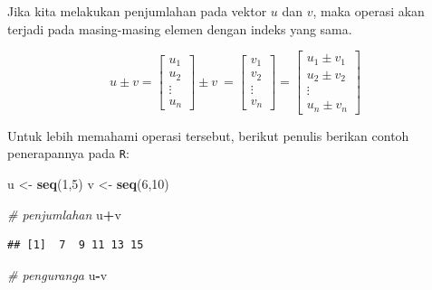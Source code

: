 \documentclass[
]{book}
\newenvironment{Shaded}{\begin{snugshade}}{\end{snugshade}}
\newcommand{\CommentTok}[1]{\textcolor[rgb]{0.56,0.35,0.01}{\textit{#1}}}
\newcommand{\DecValTok}[1]{\textcolor[rgb]{0.00,0.00,0.81}{#1}}
\newcommand{\FunctionTok}[1]{\textcolor[rgb]{0.13,0.29,0.53}{\textbf{#1}}}
\newcommand{\NormalTok}[1]{#1}
\newcommand{\OtherTok}[1]{\textcolor[rgb]{0.56,0.35,0.01}{#1}}
\newcommand{\SpecialCharTok}[1]{\textcolor[rgb]{0.81,0.36,0.00}{\textbf{#1}}}
\theoremstyle{definition}
\theoremstyle{definition}
\theoremstyle{definition}
\theoremstyle{definition}
\theoremstyle{remark}
\begin{document}
Jika kita melakukan penjumlahan pada vektor \(u\) dan \(v\), maka operasi akan terjadi pada masing-masing elemen dengan indeks yang sama.

\begin{equation}
u \pm v = \begin{bmatrix}
      u_1            \\[0.3em]
      u_2            \\[0.3em]
      \vdots         \\[0.3em] 
      u_n
     \end{bmatrix}
\pm v\ = \begin{bmatrix}
      v_1            \\[0.3em]
      v_2            \\[0.3em]
      \vdots         \\[0.3em] 
      v_n
     \end{bmatrix}
= \begin{bmatrix}
      u_1 \pm v_1            \\[0.3em]
      u_2 \pm v_2           \\[0.3em]
      \vdots         \\[0.3em] 
      u_n \pm v_n
     \end{bmatrix}
     \label{eq:addvector2}
\end{equation}

Untuk lebih memahami operasi tersebut, berikut penulis berikan contoh penerapannya pada \texttt{R}:

\begin{Shaded}
\begin{Highlighting}[]
\NormalTok{u }\OtherTok{\textless{}{-}} \FunctionTok{seq}\NormalTok{(}\DecValTok{1}\NormalTok{,}\DecValTok{5}\NormalTok{)}
\NormalTok{v }\OtherTok{\textless{}{-}} \FunctionTok{seq}\NormalTok{(}\DecValTok{6}\NormalTok{,}\DecValTok{10}\NormalTok{)}

\CommentTok{\# penjumlahan}
\NormalTok{u}\SpecialCharTok{+}\NormalTok{v}
\end{Highlighting}
\end{Shaded}

\begin{verbatim}
## [1]  7  9 11 13 15
\end{verbatim}

\begin{Shaded}
\begin{Highlighting}[]
\CommentTok{\# penguranga}
\NormalTok{u}\SpecialCharTok{{-}}\NormalTok{v}
\end{Highlighting}
\end{Shaded}
\end{document}
